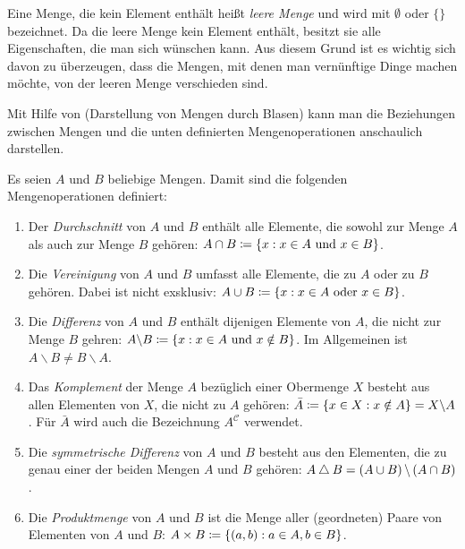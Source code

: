 Eine Menge, die kein Element enthält heißt \emph{leere Menge} und wird mit $\emptyset$ oder $\{\}$ bezeichnet. Da die leere Menge kein Element enthält, besitzt sie alle Eigenschaften, die man sich wünschen kann. Aus diesem Grund ist es wichtig sich davon zu überzeugen, dass die Mengen, mit denen man vernünftige Dinge machen möchte, von der leeren Menge verschieden sind.

Mit Hilfe von  (Darstellung von Mengen durch Blasen) kann man die Beziehungen zwischen Mengen und die unten definierten Mengenoperationen anschaulich darstellen.

\begin{definition}
Es seien $A$ und $B$ beliebige Mengen. Damit sind die folgenden Mengenoperationen definiert:
\begin{enumerate}
\item Der \emph{Durchschnitt} von $A$ und $B$ enthält alle Elemente, die sowohl zur Menge $A$ als auch zur Menge $B$ gehören: $A \cap B \mathrel{\mathop:\!\!=} \left\{x : x \in A \text{ und } x \in B\right\}$.
\item Die \emph{Vereinigung} von $A$ und $B$ umfasst alle Elemente, die zu $A$ oder zu $B$ gehören. Dabei ist  nicht exsklusiv: $A \cup B \mathrel{\mathop:\!\!=} \left\{x : x \in A \text{ oder } x \in B\right\}$.
\item Die \emph{Differenz} von $A$ und $B$ enthält dijenigen Elemente von $A$, die nicht zur Menge $B$ gehren: $A \backslash B \mathrel{\mathop:\!\!=} \left\{x : x \in A \text{ und } x \notin B\right\}$. Im Allgemeinen ist $A \backslash B \neq B \backslash A$.
\item Das \emph{Komplement} der Menge $A$ bezüglich einer Obermenge $X$ besteht aus allen Elementen von $X$, die nicht zu $A$ gehören: $\bar{A} \mathrel{\mathop:\!\!=} \left\{ x \in X : x \notin A\right\} = X \backslash A$. Für $\bar{A}$ wird auch die Bezeichnung $A^{\mathcal{C}}$ verwendet.
\item Die \emph{symmetrische Differenz} von $A$ und $B$ besteht aus den Elementen, die zu genau einer der beiden Mengen $A$ und $B$ gehören: $A \bigtriangleup B = \left(A \cup B\right) \backslash \left(A \cap B\right)$.
\item Die \emph{Produktmenge} von $A$ und $B$ ist die Menge aller (geordneten) Paare von Elementen von $A$ und $B$: $A \times B \mathrel{\mathop:\!\!=} \left\{\left(a, b\right) : a \in A, b \in B\right\}$.
\end{enumerate}
\end{definition}

